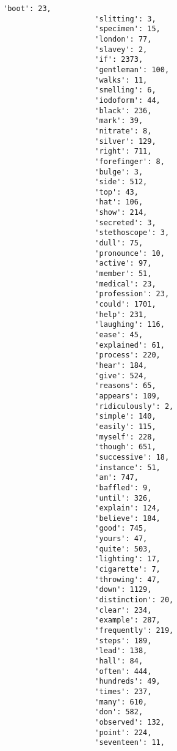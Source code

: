 \documentclass[11pt]{article}
\begin{document}
\begin{Verbatim}[commandchars=\\\{\}]
                     'boot': 23,
                     'slitting': 3,
                     'specimen': 15,
                     'london': 77,
                     'slavey': 2,
                     'if': 2373,
                     'gentleman': 100,
                     'walks': 11,
                     'smelling': 6,
                     'iodoform': 44,
                     'black': 236,
                     'mark': 39,
                     'nitrate': 8,
                     'silver': 129,
                     'right': 711,
                     'forefinger': 8,
                     'bulge': 3,
                     'side': 512,
                     'top': 43,
                     'hat': 106,
                     'show': 214,
                     'secreted': 3,
                     'stethoscope': 3,
                     'dull': 75,
                     'pronounce': 10,
                     'active': 97,
                     'member': 51,
                     'medical': 23,
                     'profession': 23,
                     'could': 1701,
                     'help': 231,
                     'laughing': 116,
                     'ease': 45,
                     'explained': 61,
                     'process': 220,
                     'hear': 184,
                     'give': 524,
                     'reasons': 65,
                     'appears': 109,
                     'ridiculously': 2,
                     'simple': 140,
                     'easily': 115,
                     'myself': 228,
                     'though': 651,
                     'successive': 18,
                     'instance': 51,
                     'am': 747,
                     'baffled': 9,
                     'until': 326,
                     'explain': 124,
                     'believe': 184,
                     'good': 745,
                     'yours': 47,
                     'quite': 503,
                     'lighting': 17,
                     'cigarette': 7,
                     'throwing': 47,
                     'down': 1129,
                     'distinction': 20,
                     'clear': 234,
                     'example': 287,
                     'frequently': 219,
                     'steps': 189,
                     'lead': 138,
                     'hall': 84,
                     'often': 444,
                     'hundreds': 49,
                     'times': 237,
                     'many': 610,
                     'don': 582,
                     'observed': 132,
                     'point': 224,
                     'seventeen': 11,

\end{Verbatim}
\end{document}
